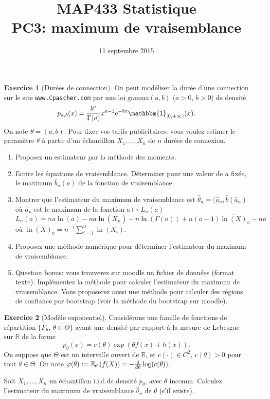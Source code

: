 \documentclass[a4paper,11pt,fleqn]{article}
\title{{\bf MAP433 Statistique}\\
{\bf PC3: maximum de vraisemblance}}
\date{11 septembre 2015}
\def\1{\mathbbm{1}}
\def\rme{\mathrm{e}}
\newcommand{\R}{\ensuremath{\mathbb{R}}}
\newcommand{\E}{\ensuremath{\mathbb{E}}}
\newcommand{\pa}[1]{\left(#1\right)}
\theoremstyle{definition}
\newtheorem{exercice}{Exercice}
\newcommand{\coint}[1]{\left[#1\right)}
\begin{document}
\maketitle

\begin{exercice}[Dur\'ees de connection]
On peut mod\'eliser la dur\'ee d'une connection sur le site {\tt www.Cpascher.com} par une loi gamma$(a,b)$ ($a > 0$, $b> 0$) de densit\'e
$$  p_{a,b}(x) = \frac{b^a}{\Gamma(a)} x^{a-1} \rme^{- b x } \1_{\coint{0,+\infty}}(x).$$
On note $\theta= (a,b)$.
Pour fixer vos tarifs publicitaires, vous voulez estimer le param\`etre $\theta$ \`a partir
 d'un \'echantillon $X_1,\ldots,X_n$  de $n$ dur\'ees de connexion. 
\begin{enumerate}
\item  Proposez un estimateur par la m\'ethode des moments. 
\item  Ecrire les équations de vraisemblance. Déterminer pour une valeur de $a$ fixée, le maximum $\hat{b}_n(a)$ de la fonction de vraisemblance.
\item  Montrer que l'estimateur du maximum de vraisemblance est $\hat{\theta}_n= (\hat{a}_n, \hat{b}(\hat{a}_n)$ où $\hat{a}_n$ est le maximum de la fonction $a \mapsto L_n(a)$
$$
L_n(a)= n a \ln(a) - n a \ln(\bar{X}_n) -n \ln(\Gamma(a))+ n(a-1)\overline{\ln(X)}_n - n a 
$$
où $\overline{\ln(X)}_n= n^{-1} \sum_{i=1}^n \ln(X_i)$. 
\item Proposez une méthode numérique pour déterminer l'estimateur du maximum de vraisemblance.  
\item Question bonus: vous trouverez sur moodle un fichier de données (format texte). Implémentez la méthode pour calculer l'estimateur du maximum de vraisemblance. Vous proposerez aussi une méthode pour calculer des régions de confiance par bootstrap (voir la méthode du bootstrap sur moodle).
\end{enumerate}
\end{exercice}

\begin{exercice}[Mod\`ele exponentiel]
Consid\'erons une famille de fonctions de r\'epartition $\{F_{\theta},\ \theta\in\Theta\}$ ayant une
densit\'e par rapport \`a la mesure de Lebesgue sur $\R$
de la forme
$$p_{\theta}(x)=c(\theta)\exp\pa{\theta f(x)+h(x)}.$$
On suppose que $\Theta$ est un intervalle ouvert de $\R$, et $c(\cdot)\in C^2$,
$c(\theta)>0$ pour tout $\theta\in \Theta$. On note
$\varphi(\theta):=\E_{\theta}\pa{f(X)}=-{d\over
d\theta}\log(c(\theta))$.

Soit $X_{1},\ldots,X_{n}$ un \'echantillon i.i.d.\;de densit\'e $p_{\theta}$, avec $\theta$ inconnu.
 Calculez l'estimateur du maximum de vraisemblance $\hat \theta_n$ de $\theta$ (s'il existe).
\end{exercice}
\end{document}
